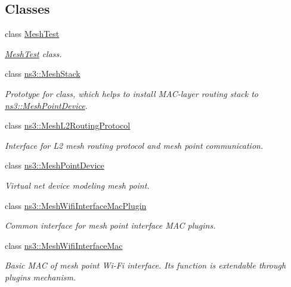 \subsection*{Classes}
\begin{DoxyCompactItemize}
\item 
class \hyperlink{classMeshTest}{Mesh\+Test}
\begin{DoxyCompactList}\small\item\em \hyperlink{classMeshTest}{Mesh\+Test} class. \end{DoxyCompactList}\item 
class \hyperlink{classns3_1_1MeshStack}{ns3\+::\+Mesh\+Stack}
\begin{DoxyCompactList}\small\item\em Prototype for class, which helps to install M\+A\+C-\/layer routing stack to \hyperlink{classns3_1_1MeshPointDevice}{ns3\+::\+Mesh\+Point\+Device}. \end{DoxyCompactList}\item 
class \hyperlink{classns3_1_1MeshL2RoutingProtocol}{ns3\+::\+Mesh\+L2\+Routing\+Protocol}
\begin{DoxyCompactList}\small\item\em Interface for L2 mesh routing protocol and mesh point communication. \end{DoxyCompactList}\item 
class \hyperlink{classns3_1_1MeshPointDevice}{ns3\+::\+Mesh\+Point\+Device}
\begin{DoxyCompactList}\small\item\em Virtual net device modeling mesh point. \end{DoxyCompactList}\item 
class \hyperlink{classns3_1_1MeshWifiInterfaceMacPlugin}{ns3\+::\+Mesh\+Wifi\+Interface\+Mac\+Plugin}
\begin{DoxyCompactList}\small\item\em Common interface for mesh point interface M\+AC plugins. \end{DoxyCompactList}\item 
class \hyperlink{classns3_1_1MeshWifiInterfaceMac}{ns3\+::\+Mesh\+Wifi\+Interface\+Mac}
\begin{DoxyCompactList}\small\item\em Basic M\+AC of mesh point Wi-\/\+Fi interface. Its function is extendable through plugins mechanism. \end{DoxyCompactList}\end{DoxyCompactItemize}


